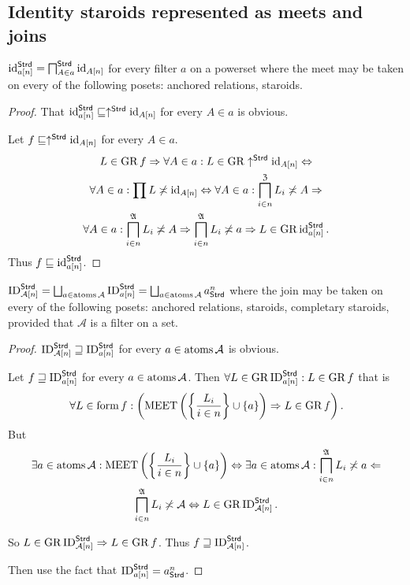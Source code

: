 \subsection{Identity staroids represented as meets and joins}
\begin{prop}
$\operatorname{id}_{a[n]}^{\mathsf{Strd}}=\bigsqcap_{A\in a}^{\mathsf{Strd}}\operatorname{id}_{A[n]}$
for every filter $a$ on a powerset where the meet may be taken on
every of the following posets: anchored relations, staroids.\end{prop}
\begin{proof}
That $\operatorname{id}_{a[n]}^{\mathsf{Strd}}\sqsubseteq\uparrow^{\mathsf{Strd}}\operatorname{id}_{A[n]}$
for every $A\in a$ is obvious.

Let $f\sqsubseteq\uparrow^{\mathsf{Strd}}\operatorname{id}_{A[n]}$ for every $A\in a$.
\begin{multline*}
L\in\operatorname{GR} f\Rightarrow \forall A\in a:L\in\operatorname{GR}\uparrow^{\mathsf{Strd}}\operatorname{id}_{A[n]}\Leftrightarrow \\
\forall A\in a:\prod L\not\asymp\operatorname{id}_{A[n]}\Leftrightarrow
\forall A\in a:\bigsqcap_{i\in n}^{\mathfrak{Z}}L_{i}\not\asymp A\Rightarrow \\
\forall A\in a:\bigsqcap_{i\in n}^{\mathfrak{A}}L_{i}\not\asymp A\Rightarrow
\bigsqcap_{i\in n}^{\mathfrak{A}}L_{i}\not\asymp a\Rightarrow L\in\operatorname{GR}\operatorname{id}_{a[n]}^{\mathsf{Strd}}.
\end{multline*}
Thus $f\sqsubseteq\operatorname{id}_{a[n]}^{\mathsf{Strd}}$.\end{proof}
\begin{prop}
$\operatorname{ID}_{\mathcal{A}[n]}^{\mathsf{Strd}}=\bigsqcup_{a\in\operatorname{atoms}\mathcal{A}}\operatorname{ID}_{a[n]}^{\mathsf{Strd}}=\bigsqcup_{a\in\operatorname{atoms}\mathcal{A}}a_{\mathsf{Strd}}^{n}$
where the join may be taken on every of the following posets: anchored
relations, staroids, completary staroids, provided that $\mathcal{A}$
is a filter on a set.\end{prop}
\begin{proof}
$\operatorname{ID}_{\mathcal{A}[n]}^{\mathsf{Strd}}\sqsupseteq\operatorname{ID}_{a[n]}^{\mathsf{Strd}}$
for every $a\in\operatorname{atoms}\mathcal{A}$ is obvious.

Let $f\sqsupseteq\operatorname{ID}_{a[n]}^{\mathsf{Strd}}$ for every $a\in\operatorname{atoms}\mathcal{A}$.
Then $\forall L\in\operatorname{GR}\operatorname{ID}_{a[n]}^{\mathsf{Strd}}:L\in\operatorname{GR} f$ that is
\[
\forall L\in\operatorname{form} f:\left(\operatorname{MEET}\left(\left\{ \frac{L_{i}}{i\in n}\right\}\cup\{a\}\right)\Rightarrow L\in\operatorname{GR} f\right).
\]
But
\begin{multline*}
\exists a\in\operatorname{atoms}\mathcal{A}:\operatorname{MEET}\left(\left\{ \frac{L_{i}}{i\in n}\right\}\cup\{a\}\right)\Leftrightarrow\exists a\in\operatorname{atoms}\mathcal{A}:\bigsqcap_{i\in n}^{\mathfrak{A}}L_{i}\not\asymp a\Leftarrow\\
\bigsqcap_{i\in n}^{\mathfrak{A}}L_{i}\not\asymp\mathcal{A}\Leftrightarrow L\in\operatorname{GR}\operatorname{ID}_{\mathcal{A}[n]}^{\mathsf{Strd}}.
\end{multline*}


So $L\in\operatorname{GR}\operatorname{ID}_{\mathcal{A}[n]}^{\mathsf{Strd}}\Rightarrow L\in\operatorname{GR} f$.
Thus $f\sqsupseteq\operatorname{ID}_{\mathcal{A}[n]}^{\mathsf{Strd}}$.

Then use the fact that $\operatorname{ID}_{a[n]}^{\mathsf{Strd}}=a_{\mathsf{Strd}}^{n}$.\end{proof}
